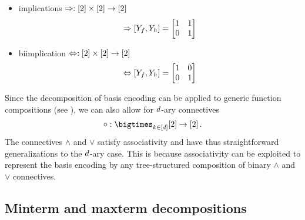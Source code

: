 \begin{example}
\begin{itemize}
\begin{align*}
\begin{bmatrix}
                  0 & 1 \\
                  1 & 0
            \end{bmatrix}
        \end{align*}
        \item implications $\Rightarrow:  [2]\times[2] \rightarrow[2]$
        \begin{align*}
            \Rightarrow[Y_{f},Y_{h}]
            = \begin{bmatrix}
                  1 & 1 \\
                  0 & 1
            \end{bmatrix}
        \end{align*}
        \item biimplication $\Leftrightarrow:  [2]\times[2] \rightarrow[2]$
        \begin{align*}
            \Leftrightarrow[Y_{f},Y_{h}]
            = \begin{bmatrix}
                  1 & 0 \\
                  0 & 1
            \end{bmatrix}
        \end{align*}
    \end{itemize}
\end{example}

\begin{remark}
    \label{rem:naryConnectives}
    Since the decomposition of basis encoding can be applied to generic function compositions (see ), we can also allow for $d$-ary connectives
    \begin{align*}
        \exconnective : \bigtimes_{\atomenumeratorin} [2] \rightarrow [2] \, .
    \end{align*}
    The connectives $\land$ and $\lor$ satisfy associativity and have thus straightforward generalizations to the $d$-ary case.
    This is because associativity can be exploited to represent the basis encoding by any tree-structured composition of binary $\land$ and $\lor$ connectives.
\end{remark}

\subsection{Minterm and maxterm decompositions}\label{sec:termClauseDecomposition}

